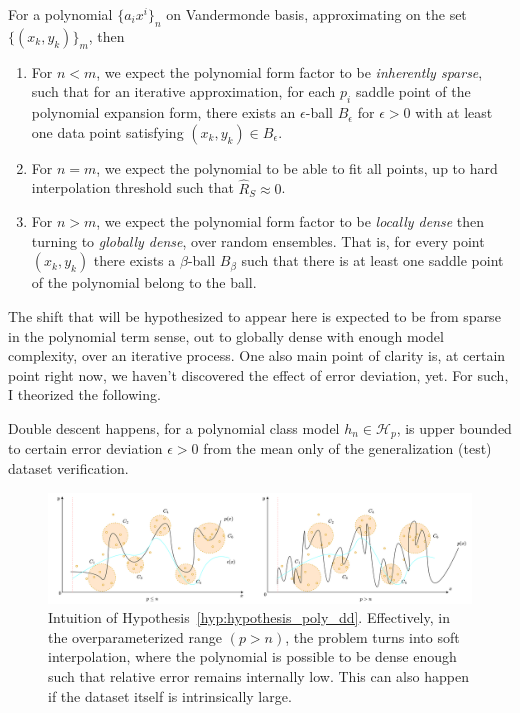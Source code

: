 \documentclass[10pt]{article} %
\begin{document}
\begin{hypothesis}\label{hyp:hypothesis_poly_dd}
For a polynomial $\{a_{i}x^{i}\}_{n}$ on Vandermonde basis, approximating on the set $\{(x_{k},y_{k})\}_{m}$, then
\begin{enumerate}[topsep=1pt,itemsep=1pt]
  \item For $n<m$, we expect the polynomial form factor to be \textit{inherently sparse}, such that for an iterative approximation, for each $p_{i}$ saddle point of the polynomial expansion form, there exists an $\epsilon$-ball $B_{\epsilon}$ for $\epsilon>0$ with at least one data point satisfying $(x_{k},y_{k})\in B_{\epsilon}$. 
  \item For $n=m$, we expect the polynomial to be able to fit all points, up to hard interpolation threshold such that $\hat{R}_{S}\approx 0$. 
  \item For $n>m$, we expect the polynomial form factor to be \textit{locally dense} then turning to \textit{globally dense}, over random ensembles. That is, for every point $(x_{k},y_{k})$ there exists a $\beta$-ball $B_{\beta}$ such that there is at least one saddle point of the polynomial belong to the ball. 
\end{enumerate}
\end{hypothesis}

The shift that will be hypothesized to appear here is expected to be from sparse in the polynomial term sense, out to globally dense with enough model complexity, over an iterative process. One also main point of clarity is, at certain point right now, we haven't discovered the effect of error deviation, yet. For such, I theorized the following. 

\begin{conjecture}
  Double descent happens, for a polynomial class model $h_{n}\in\mathcal{H}_{p}$, is upper bounded to certain error deviation $\epsilon>0$ from the mean only of the generalization (test) dataset verification. 
\end{conjecture}

\begin{figure}[htb]
    \centering
    \includegraphics[width=1\textwidth]{diagram_poly_dd.png}
    \caption{Intuition of Hypothesis~\ref{hyp:hypothesis_poly_dd}. Effectively, in the overparameterized range $(p>n)$, the problem turns into soft interpolation, where the polynomial is possible to be dense enough such that relative error remains internally low. This can also happen if the dataset itself is intrinsically large.}
\end{figure}
\end{document}
